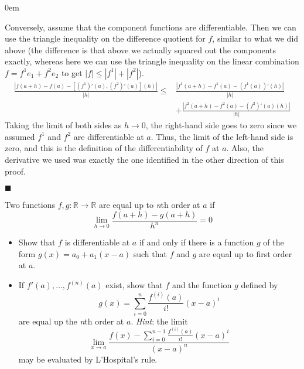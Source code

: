 \documentclass[12pt]{article}
\renewcommand{\qed}{\hfill$\blacksquare$}
\renewenvironment{proof}{\begin{addmargin}[1em]{0em}\begin{newproof}}{\end{newproof}\end{addmargin}\qed}
\newenvironment{problem}[2][Problem]{\begin{trivlist}
\item[\hskip \labelsep {\bfseries #1}\hskip \labelsep {\bfseries #2.}]}{\end{trivlist}}
\begin{document}
\begin{proof}
Conversely, assume that the component functions are differentiable. Then we can use the triangle inequality on the difference quotient for $f$, similar to what we did above (the difference is that above we actually squared out the components exactly, whereas here we can use the triangle inequality on the linear combination $f = f^1 e_1 + f^2 e_2$ to get $\left|f\right| \leq \left|f^1\right| + \left|f^2\right|$).
\begin{equation*}\begin{split}
\frac{\left| f\left(a+h\right)  - f\left(a\right) - \left[\left(f^1\right)' \left(a\right), \left(f^2\right)'\left(a\right) \right]\left(h\right)\right|}{\left| h\right|} \leq  & \frac{\left| f^1\left(a+h\right) - f^1\left(a\right) - \left(f^1\left(a\right)\right)'\left(h\right)\right|}{\left| h\right|}  \\ & + \frac{\left| f^2\left(a+h\right) - f^2\left(a\right) - \left(f^2\right)'\left(a\right)\left(h\right)\right|}{\left| h\right|}
\end{split}\end{equation*}
Taking the limit of both sides as $h\rightarrow 0$, the right-hand side goes to zero since we assumed $f^1$ and $f^2$ are differentiable at $a$. Thus, the limit of the left-hand side is zero, and this is the definition of the differentiability of $f$ at $a$. Also, the derivative we used was exactly the one identified in the other direction of this proof.
\end{proof}





\begin{problem}{2.9}
Two functions $f,g:\mathbb{R}\rightarrow \mathbb{R}$ are equal up to \textit{n}th order at $a$ if 
$$ \lim_{h\rightarrow 0} \frac{f\left(a+h\right) -g\left(a+h\right)}{h^n} = 0 $$
\begin{itemize}
	\item Show that $f$ is differentiable at $a$ if and only if there is a function $g$ of the form $g\left(x\right) = a_0 + a_1 \left(x-a\right)$ such that $f$ and $g$ are equal up to first order at $a$. \\
	\item If $f'\left(a\right),\ldots,f^{\left(n\right)}\left(a\right)$ exist, show that $f$ and the function $g$ defined by
	$$ g\left(x\right) = \sum_{i=0}^n \frac{f^{\left(i\right)}\left(a\right)}{i!} \left(x-a\right)^i $$ are equal up the \textit{n}th order at $a$. \textit{Hint}: the limit 
	$$ \lim_{x\rightarrow a} \frac{f\left(x\right) - \sum_{i=0}^{n-1} \frac{f^{\left(i\right)}\left(a\right)}{i!} \left(x-a\right)^i}{\left(x-a\right)^n} $$ may be evaluated by L'Hospital's rule.
\end{itemize} 
\end{problem}
\end{document}
